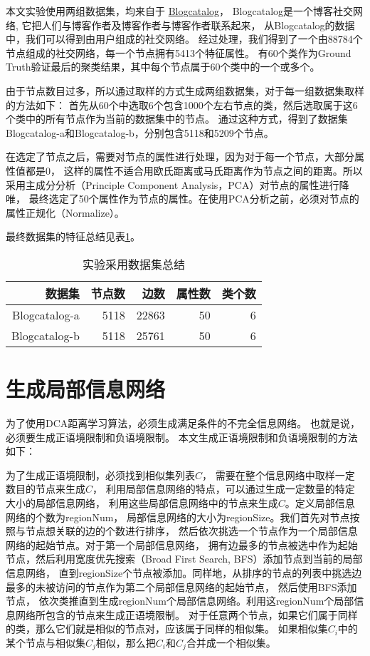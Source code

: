 本文实验使用两组数据集，均来自于
\href{http://www.blogcatalog.com/}{Blogcatalog}，
Blogcatalog是一个博客社交网络, 它把人们与博客作者及博客作者与博客作者联系起来，
从Blogcatalog的数据中，我们可以得到由用户组成的社交网络。
经过处理，我们得到了一个由88784个节点组成的社交网络，每一个节点拥有5413个特征属性。
有60个类作为Ground Truth验证最后的聚类结果，其中每个节点属于60个类中的一个或多个。

由于节点数目过多，所以通过取样的方式生成两组数据集，对于每一组数据集取样的方法如下：
首先从60个中选取6个包含1000个左右节点的类，然后选取属于这6个类中的所有节点作为当前的数据集中的节点。
通过这种方式，得到了数据集Blogcatalog-a和Blogcatalog-b，分别包含5118和5209个节点。

在选定了节点之后，需要对节点的属性进行处理，因为对于每一个节点，大部分属性值都是0，
这样的属性不适合用欧氏距离或马氏距离作为节点之间的距离。所以采用主成分分析（Principle Component Analysis，PCA）对节点的属性进行降唯，
最终选定了50个属性作为节点的属性。在使用PCA分析之前，必须对节点的属性正规化（Normalize）。

最终数据集的特征总结见表\ref{tab:datasetsummary}。

\begin{table}[!hpb]
  \centering
  \caption{实验采用数据集总结}
  \label{tab:datasetsummary}
  \begin{tabular}{rrrrr} \toprule
    数据集 & 节点数 & 边数  & 属性数 & 类个数\\ \midrule
    Blogcatalog-a & 5118 & 22863 & 50 & 6 \\
    Blogcatalog-b & 5118 & 25761  & 50 & 6 \\ \bottomrule
  \end{tabular}
\end{table}


\section{生成局部信息网络}

为了使用DCA距离学习算法，必须生成满足条件的不完全信息网络。
也就是说，必须要生成正语境限制和负语境限制。
本文生成正语境限制和负语境限制的方法如下：

为了生成正语境限制，必须找到相似集列表$C$，
需要在整个信息网络中取样一定数目的节点来生成$C$，
利用局部信息网络的特点，可以通过生成一定数量的特定大小的局部信息网络，
利用这些局部信息网络中的节点来生成$C$。定义局部信息网络的个数为regionNum，
局部信息网络的大小为regionSize。我们首先对节点按照与节点想关联的边的个数进行排序，
然后依次挑选一个节点作为一个局部信息网络的起始节点。对于第一个局部信息网络，
拥有边最多的节点被选中作为起始节点，然后利用宽度优先搜索（Broad First Search, BFS）添加节点到当前的局部信息网络，
直到regionSize个节点被添加。同样地，从排序的节点的列表中挑选边最多的未被访问的节点作为第二个局部信息网络的起始节点，
然后使用BFS添加节点，
依次类推直到生成regionNum个局部信息网络。利用这regionNum个局部信息网络所包含的节点来生成正语境限制。
对于任意两个节点，如果它们属于同样的类，那么它们就是相似的节点对，应该属于同样的相似集。
如果相似集$C_i$中的某个节点与相似集$C_j$相似，那么把$C_i$和$C_j$合并成一个相似集。

